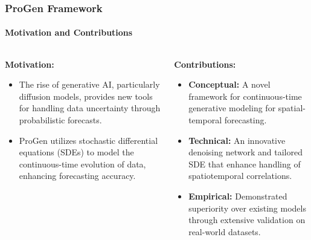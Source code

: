 \documentclass[light]{lutbeamer} %
\begin{document}
\begin{frame}
    \frametitle{ProGen Framework}
    \framesubtitle{Motivation and Contributions}

    \begin{columns}[T]
        \begin{column}{0.48\textwidth}
            \textbf{Motivation:}
            \begin{itemize}
                \item The rise of generative AI, particularly diffusion models, provides new tools for handling data uncertainty through probabilistic forecasts.
                \item ProGen utilizes stochastic differential equations (SDEs) to model the continuous-time evolution of data, enhancing forecasting accuracy.
            \end{itemize}
        \end{column}
        \begin{column}{0.48\textwidth}
            \textbf{Contributions:}
            \begin{itemize}
                \item \textbf{Conceptual:} A novel framework for continuous-time generative modeling for spatial-temporal forecasting.
                \item \textbf{Technical:} An innovative denoising network and tailored SDE that enhance handling of spatiotemporal correlations.
                \item \textbf{Empirical:} Demonstrated superiority over existing models through extensive validation on real-world datasets.
            \end{itemize}
        \end{column}
    \end{columns}
\end{frame}
\end{document}
